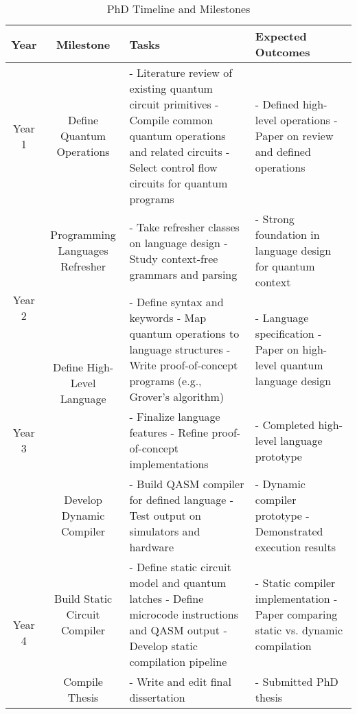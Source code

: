 \documentclass[journal,onecolumn, compsoc]{IEEEtran}
\begin{document}
\begin{table}[H]
\centering
\caption{PhD Timeline and Milestones}
\begin{tabular}{@{}c|c|p{6cm}|p{5cm}@{}}
\toprule
\textbf{Year} & \textbf{Milestone} & \textbf{Tasks} & \textbf{Expected Outcomes} \\
\midrule

Year 1 
& Define Quantum Operations 
& - Literature review of existing quantum circuit primitives \newline
  - Compile common quantum operations and related circuits \newline
  - Select control flow circuits for quantum programs 
& - Defined high-level operations \newline
  - Paper on review and defined operations \\
\midrule

\multirow{2}{*}{Year 2} 
& Programming Languages Refresher 
& - Take refresher classes on language design \newline
  - Study context-free grammars and parsing 
& - Strong foundation in language design for quantum context \\
\cmidrule{2-4}

& \multirow{2}{*}{Define High-Level Language} 
& - Define syntax and keywords \newline
  - Map quantum operations to language structures \newline
  - Write proof-of-concept programs (e.g., Grover's algorithm) 
& - Language specification \newline
  - Paper on high-level quantum language design \\
\cline{1-1} %

Year 3 
&  
& - Finalize language features \newline
  - Refine proof-of-concept implementations 
& - Completed high-level language prototype \\
\cmidrule{2-4}

\multirow{1}{*}{} 
& Develop Dynamic Compiler 
& - Build QASM compiler for defined language \newline
  - Test output on simulators and hardware 
& - Dynamic compiler prototype \newline
  - Demonstrated execution results \\
\midrule

\multirow{2}{*}{Year 4} 
& Build Static Circuit Compiler 
& - Define static circuit model and quantum latches \newline
  - Define microcode instructions and QASM output \newline
  - Develop static compilation pipeline 
& - Static compiler implementation \newline
  - Paper comparing static vs. dynamic compilation \\
\cmidrule{2-4}

& Compile Thesis 
& - Write and edit final dissertation 
& - Submitted PhD thesis \\
\bottomrule
\end{tabular}
\end{table}
\end{document}
